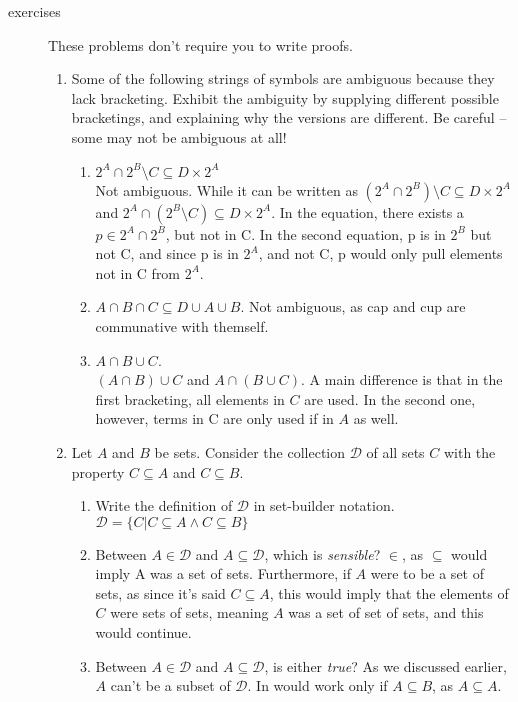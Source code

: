 \documentclass[11pt]{letter}
\theoremstyle{definition}
\begin{document}
\begin{description}
	\item[exercises]  These problems don't require you to write proofs.
\begin{enumerate}
		\item Some of the following strings of symbols are ambiguous because they lack bracketing. Exhibit the ambiguity by supplying different possible bracketings, and explaining why the versions are different. Be careful -- some may not be  ambiguous at all!
			\begin{enumerate}
				\item $2^A\cap 2^B\setminus C \subseteq D\times 2^A$\\
Not ambiguous. While it can be written as $(2^A\cap 2^B)\setminus C \subseteq D\times 2^A$ and $2^A\cap (2^B\setminus C) \subseteq D\times 2^A$. In the equation, there exists a $p\in 2^A\cap 2^B$, but not in C. In the second equation, p is in $2^B$ but not C, and since p is in $2^A$, and not C, p would only pull elements not in C from $2^A$.
				\item $A\cap B\cap C  \subseteq D\cup A\cup B$. Not ambiguous, as cap and cup are communative with themself.
				\item $A\cap B \cup C$.\\
$(A\cap B)\cup C$ and $A\cap (B \cup C)$.  A main difference is that in the first bracketing, all elements in $C$ are used. In the second one, however, terms in C are only used if in $A$ as well.
			\end{enumerate}
		\item  Let $A$ and $B$ be sets. Consider the collection $\mathcal{D}$ of all sets $C$ with the property $C\subseteq A$ and $C\subseteq B$.
			\begin{enumerate}
				\item Write the definition of $\mathcal{D}$ in set-builder notation.\\
                                  $\mathcal{D} =\{C\vert C\subseteq A\wedge C\subseteq B\}$
				\item Between $A\in \mathcal{D}$ and $A\subseteq\mathcal{D}$, which is {\em sensible}?
                                  $\in$, as $\subseteq$ would imply A was a set of sets. Furthermore, if $A$ were to be a set of sets, as since it's said $C\subseteq A$, this would imply that the elements of $C$ were sets of sets, meaning $A$ was a set of set of sets, and this would continue.
				\item Between $A\in \mathcal{D}$ and $A\subseteq\mathcal{D}$, is either {\em true}?
As we discussed earlier, $A$ can't be a subset of $\mathcal{D}$. In would work only if $A\subseteq B$, as $A\subseteq A$.

\end{enumerate}
\end{enumerate}
\end{description}
\end{document}
